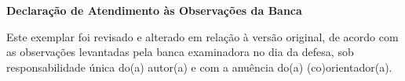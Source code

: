 

\begin{center}
	{\LARGE \textbf{Declaração de Atendimento às Observações da Banca}}
\end{center}
\vspace{\onelineskip}


Este exemplar foi revisado e alterado em relação à versão original, de acordo com as observações levantadas pela banca examinadora no dia da defesa, sob responsabilidade única do(a) autor(a) e com a anuência do(a) (co)orientador(a).
%
%
%



 